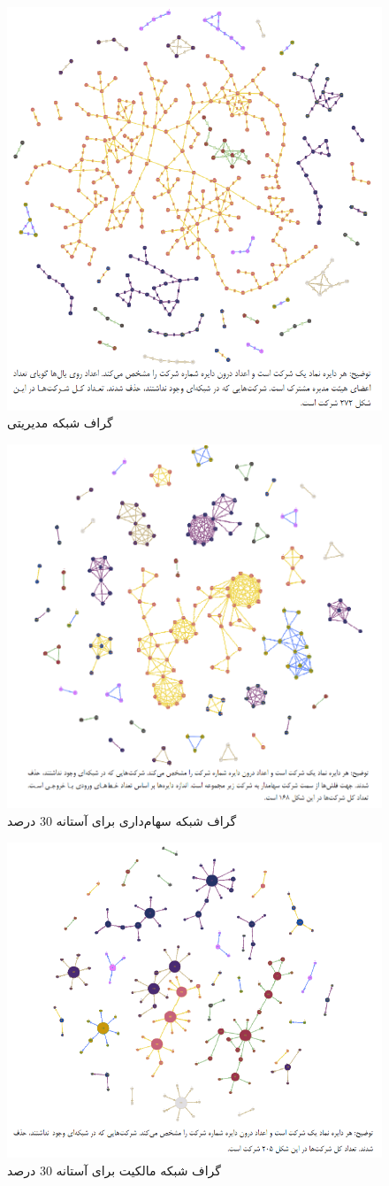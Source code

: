 \documentclass[12pt]{article}
\begin{document}
\begin{figure}[htbp]
\centering
  \includegraphics[width=0.6\linewidth]{m.png}
  \caption{گراف شبکه مدیریتی }
  \label{m}
 \end{figure} 
\begin{figure}[htbp]
\centering
  \includegraphics[width=0.6\linewidth]{h1.png}
  \caption{گراف شبکه سهام‌داری برای آستانه 30 درصد }
  \label{h1}
 \end{figure}
 \begin{figure}[htbp]
 \centering
   \includegraphics[width=0.6\linewidth]{h.png}
   \caption{گراف شبکه مالکیت برای آستانه 30 درصد }
   \label{h}
  \end{figure}
\FloatBarrier
\end{document}
